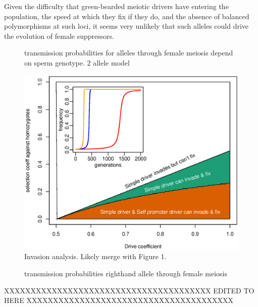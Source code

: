 \documentclass[12pt,letterpaper]{article}
\newcommand{\yb}[1]{{ \color{blue} #1}}
\begin{document}
Given the difficulty that green-bearded meiotic drivers have entering the population, the speed at
which they fix if they do, \yb{and the absence of balanced polymorphisms at such loci,} it seems very unlikely that such alleles
could drive the evolution of female \yb{suppressors}.

\begin{figure}
\caption{transmission probabilities for alleles through female
  meiosis depend on sperm genotype. 2 allele model}  
\label{Eggsperm_2_allele_cartoon}
\end{figure}

\begin{figure}
\includegraphics[width = 0.8 \textwidth]{Figures/invasion_space_recessive_driver.eps}
\caption{Invasion analysis. Likely merge with Figure 1.} \label{Invasion_space}
\end{figure}


\begin{figure}
\caption{transmission probabilities righthand allele through female
  meiosis}  \label{Eggsperm_3_allele_cartoon}
\end{figure}


XXXXXXXXXXXXXXXXXXXXXXXXXXXXXXXXXXXXXXX\newline
EDITED TO HERE\newline
XXXXXXXXXXXXXXXXXXXXXXXXXXXXXXXXXXXXXXX\newline
\end{document}

